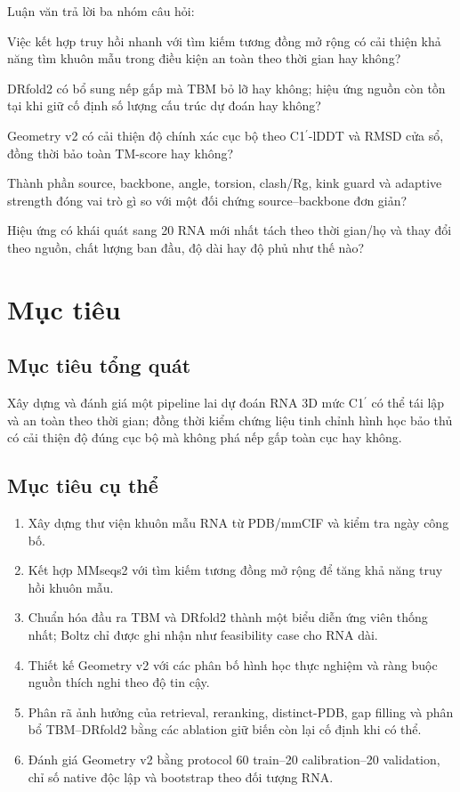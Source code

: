 \documentclass[12pt,a4paper,oneside]{report}
\newcommand{\cprime}{C1$^{\prime}$}
\begin{document}
Luận văn trả lời ba nhóm câu hỏi:

\begin{description}[leftmargin=2.2cm,style=nextline]
\item[RQ1.] Việc kết hợp truy hồi nhanh với tìm kiếm tương đồng mở rộng có cải thiện
khả năng tìm khuôn mẫu trong điều kiện an toàn theo thời gian hay không?

\item[RQ2.] DRfold2 có bổ sung nếp gấp mà TBM bỏ lỡ hay không; hiệu ứng nguồn còn tồn
tại khi giữ cố định số lượng cấu trúc dự đoán hay không?

\item[RQ3a.] Geometry v2 có cải thiện độ chính xác cục bộ theo \cprime{}-lDDT và RMSD
cửa sổ, đồng thời bảo toàn TM-score hay không?
\item[RQ3b.] Thành phần source, backbone, angle, torsion, clash/Rg, kink guard và adaptive
strength đóng vai trò gì so với một đối chứng source--backbone đơn giản?
\item[RQ3c.] Hiệu ứng có khái quát sang 20 RNA mới nhất tách theo thời gian/họ và thay
đổi theo nguồn, chất lượng ban đầu, độ dài hay độ phủ như thế nào?
\end{description}

\section{Mục tiêu}

\subsection{Mục tiêu tổng quát}

Xây dựng và đánh giá một pipeline lai dự đoán RNA 3D mức \cprime{} có thể tái lập và an
toàn theo thời gian; đồng thời kiểm chứng liệu tinh chỉnh hình học bảo thủ có cải thiện
độ đúng cục bộ mà không phá nếp gấp toàn cục hay không.

\subsection{Mục tiêu cụ thể}

\begin{enumerate}
  \item Xây dựng thư viện khuôn mẫu RNA từ PDB/mmCIF và kiểm tra ngày công bố.
  \item Kết hợp MMseqs2 với tìm kiếm tương đồng mở rộng để tăng khả năng truy hồi khuôn mẫu.
  \item Chuẩn hóa đầu ra TBM và DRfold2 thành một biểu diễn ứng viên thống nhất; Boltz
  chỉ được ghi nhận như feasibility case cho RNA dài.
  \item Thiết kế Geometry v2 với các phân bố hình học thực nghiệm và ràng buộc nguồn
  thích nghi theo độ tin cậy.
  \item Phân rã ảnh hưởng của retrieval, reranking, distinct-PDB, gap filling và phân
  bổ TBM--DRfold2 bằng các ablation giữ biến còn lại cố định khi có thể.
  \item Đánh giá Geometry v2 bằng protocol 60 train--20 calibration--20 validation,
  chỉ số native độc lập và bootstrap theo đối tượng RNA.
\end{enumerate}
\end{document}

